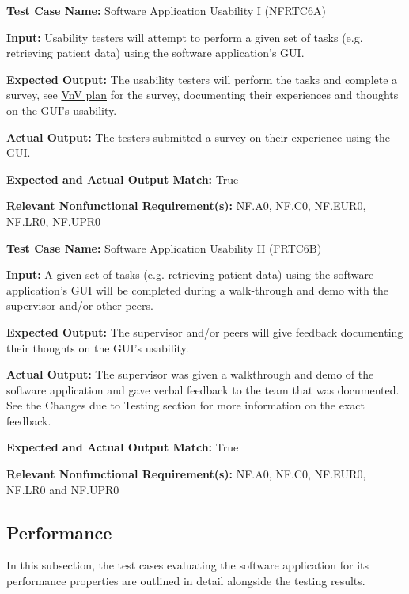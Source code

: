 \documentclass[12pt, titlepage]{article}
\begin{document}
\begin{mdframed}[linewidth=0.5mm]
  \textbf{Test Case Name:} Software Application Usability I (NFRTC6A) \par
  \textbf{Input:} Usability testers will attempt to perform a given set of tasks (e.g. retrieving patient data) using the software application's GUI. \par
  \textbf{Expected Output:} The usability testers will perform the tasks and complete a survey, see \href{https://github.com/tusharagg1/chest-x-ray-ai/blob/main/docs/VnVPlan/VnVPlan.pdf}{VnV plan} for the survey, documenting their experiences and thoughts on the GUI's usability. \par
  \textbf{Actual Output:} The testers submitted a survey on their experience using the GUI. \par
  \textbf{Expected and Actual Output Match:} True \par
  \textbf{Relevant Nonfunctional Requirement(s):} NF.A0, NF.C0, NF.EUR0, NF.LR0, NF.UPR0
\end{mdframed}

\begin{mdframed}[linewidth=0.5mm]
  \textbf{Test Case Name:} Software Application Usability II (FRTC6B) \par
  \textbf{Input:} A given set of tasks (e.g. retrieving patient data) using the software application's GUI will be completed during a walk-through and demo with the supervisor and/or other peers. \par
  \textbf{Expected Output:} The supervisor and/or peers will give feedback documenting their thoughts on the GUI's usability. \par
  \textbf{Actual Output:} The supervisor was given a walkthrough and demo of the software application and gave verbal feedback to the team that was documented. See the Changes due to Testing section for more information on the exact feedback. \par
  \textbf{Expected and Actual Output Match:} True \par
  \textbf{Relevant Nonfunctional Requirement(s):} NF.A0, NF.C0, NF.EUR0, NF.LR0 and NF.UPR0
\end{mdframed}
    
\subsection{Performance}
In this subsection, the test cases evaluating the software application for its performance properties are outlined in detail alongside the testing results. \\
\end{document}

